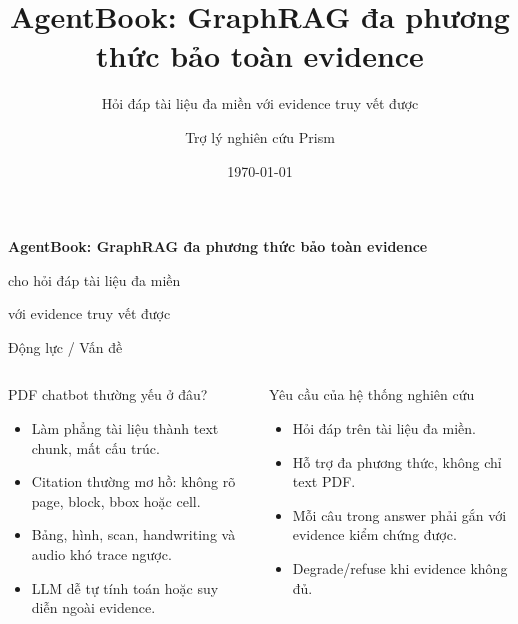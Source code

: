 \documentclass[aspectratio=169,11pt]{beamer}
\title[AgentBook]{AgentBook: GraphRAG đa phương thức bảo toàn evidence}
\subtitle{Hỏi đáp tài liệu đa miền với evidence truy vết được}
\author{Trợ lý nghiên cứu Prism}
\date{\today}
\begin{document}
\begin{frame}[plain]
\vspace{1.55cm}
\begin{center}
{\color{ABDeepBlue}\fontsize{25}{31}\selectfont\bfseries AgentBook: GraphRAG đa phương thức bảo toàn evidence\par}
\vspace{0.34cm}
{\color{ABSlate}\Large cho hỏi đáp tài liệu đa miền\par}
\vspace{0.18cm}
{\color{ABMuted}\large với evidence truy vết được\par}
\end{center}
\vfill
\end{frame}

\begin{frame}{Động lực / Vấn đề}
\begin{columns}[T,onlytextwidth]
\begin{block}{PDF chatbot thường yếu ở đâu?}
\begin{itemize}
  \item Làm phẳng tài liệu thành text chunk, mất cấu trúc.
  \item Citation thường mơ hồ: không rõ page, block, bbox hoặc cell.
  \item Bảng, hình, scan, handwriting và audio khó trace ngược.
  \item LLM dễ tự tính toán hoặc suy diễn ngoài evidence.
\end{itemize}
\end{block}
\begin{block}{Yêu cầu của hệ thống nghiên cứu}
\begin{itemize}
  \item Hỏi đáp trên tài liệu đa miền.
  \item Hỗ trợ đa phương thức, không chỉ text PDF.
  \item Mỗi câu trong answer phải gắn với evidence kiểm chứng được.
  \item Degrade/refuse khi evidence không đủ.
\end{itemize}
\end{block}
\end{columns}
\end{frame}
\end{document}

